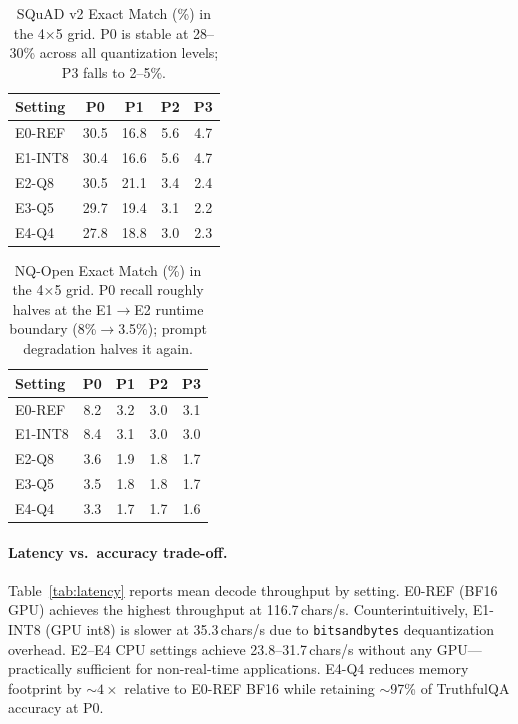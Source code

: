 \documentclass[letterpaper]{article} %
\begin{document}
\begin{table}[t]
  \small\centering
  \caption{SQuAD v2 Exact Match (\%) in the 4$\times$5 grid.
    P0 is stable at 28--30\% across all quantization levels; P3 falls to 2--5\%.}
  \label{tab:squad_grid}
  \begin{tabular}{@{}lcccc@{}}
    \toprule
    Setting & P0 & P1 & P2 & P3 \\
    \midrule
    E0-REF  & 30.5 & 16.8 & 5.6 & 4.7 \\
    E1-INT8 & 30.4 & 16.6 & 5.6 & 4.7 \\
    E2-Q8   & 30.5 & 21.1 & 3.4 & 2.4 \\
    E3-Q5   & 29.7 & 19.4 & 3.1 & 2.2 \\
    E4-Q4   & 27.8 & 18.8 & 3.0 & 2.3 \\
    \bottomrule
  \end{tabular}
\end{table}

\begin{table}[t]
  \small\centering
  \caption{NQ-Open Exact Match (\%) in the 4$\times$5 grid.
    P0 recall roughly halves at the E1$\to$E2 runtime boundary
    (8\%$\to$3.5\%); prompt degradation halves it again.}
  \label{tab:nq_grid}
  \begin{tabular}{@{}lcccc@{}}
    \toprule
    Setting & P0 & P1 & P2 & P3 \\
    \midrule
    E0-REF  & 8.2 & 3.2 & 3.0 & 3.1 \\
    E1-INT8 & 8.4 & 3.1 & 3.0 & 3.0 \\
    E2-Q8   & 3.6 & 1.9 & 1.8 & 1.7 \\
    E3-Q5   & 3.5 & 1.8 & 1.8 & 1.7 \\
    E4-Q4   & 3.3 & 1.7 & 1.7 & 1.6 \\
    \bottomrule
  \end{tabular}
\end{table}

\paragraph{Latency vs.\ accuracy trade-off.}
Table~\ref{tab:latency} reports mean decode throughput by setting.
E0-REF (BF16 GPU) achieves the highest throughput at 116.7\,chars/s.
Counterintuitively, E1-INT8 (GPU int8) is slower at 35.3\,chars/s due to
\texttt{bitsandbytes} dequantization overhead. E2--E4 CPU settings achieve
23.8--31.7\,chars/s without any GPU---practically sufficient for non-real-time
applications. E4-Q4 reduces memory footprint by ${\sim}4\times$ relative to
E0-REF BF16 while retaining ${\sim}$97\% of TruthfulQA accuracy at P0.
\end{document}
